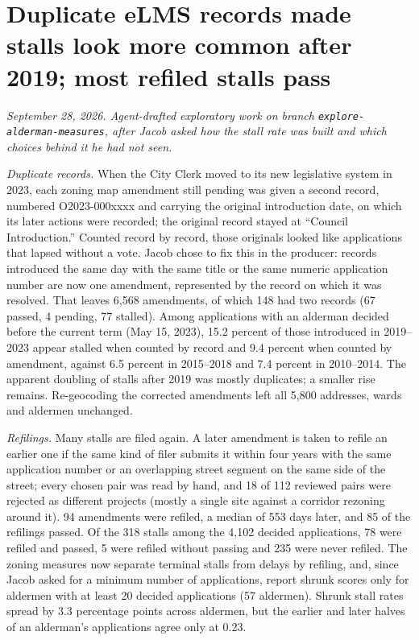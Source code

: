 \clearpage
\section*{Duplicate eLMS records made stalls look more common after 2019; most refiled stalls pass}
\textit{September 28, 2026. Agent-drafted exploratory work on branch \texttt{explore-alderman-measures}, after Jacob
asked how the stall rate was built and which choices behind it he had not seen.}

\textit{Duplicate records.} When the City Clerk moved to its new legislative system in 2023, each zoning map
amendment still pending was given a second record, numbered O2023-000xxxx and carrying the original introduction
date, on which its later actions were recorded; the original record stayed at ``Council Introduction.'' Counted
record by record, those originals looked like applications that lapsed without a vote. Jacob chose to fix this in
the producer: records introduced the same day with the same title or the same numeric application number are now one
amendment, represented by the record on which it was resolved. That leaves 6,568 amendments, of which 148 had two
records (67 passed, 4 pending, 77 stalled). Among applications with an alderman decided before the current term
(May 15, 2023), 15.2 percent of those introduced in 2019--2023 appear stalled when counted by record and 9.4 percent
when counted by amendment, against 6.5 percent in 2015--2018 and 7.4 percent in 2010--2014. The apparent doubling of
stalls after 2019 was mostly duplicates; a smaller rise remains. Re-geocoding the corrected amendments left all
5,800 addresses, wards and aldermen unchanged.

\textit{Refilings.} Many stalls are filed again. A later amendment is taken to refile an earlier one if the same
kind of filer submits it within four years with the same application number or an overlapping street segment on the
same side of the street; every chosen pair was read by hand, and 18 of 112 reviewed pairs were rejected as different
projects (mostly a single site against a corridor rezoning around it). 94 amendments were refiled, a median of 553
days later, and 85 of the refilings passed. Of the 318 stalls among the 4,102 decided applications, 78 were refiled
and passed, 5 were refiled without passing and 235 were never refiled. The zoning measures now separate terminal
stalls from delays by refiling, and, since Jacob asked for a minimum number of applications, report shrunk scores
only for aldermen with at least 20 decided applications (57 aldermen). Shrunk stall rates spread by 3.3 percentage
points across aldermen, but the earlier and later halves of an alderman's applications agree only at 0.23.

